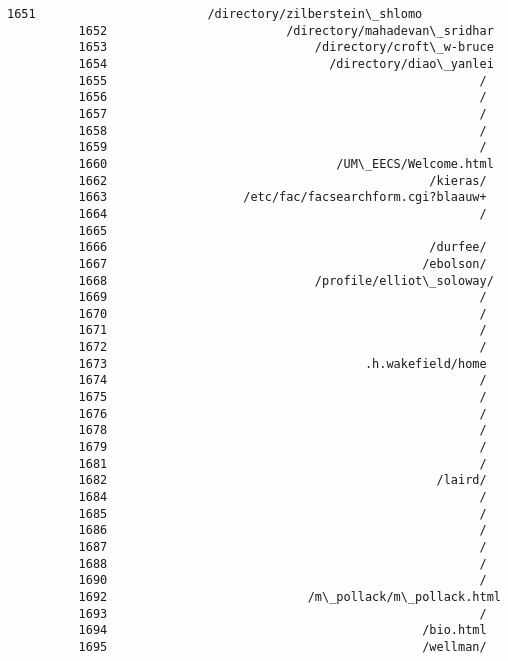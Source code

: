 \documentclass[11pt]{article}
\begin{document}
\begin{Verbatim}[commandchars=\\\{\}]
          1651                        /directory/zilberstein\_shlomo
          1652                         /directory/mahadevan\_sridhar
          1653                             /directory/croft\_w-bruce
          1654                               /directory/diao\_yanlei
          1655                                                    /
          1656                                                    /
          1657                                                    /
          1658                                                    /
          1659                                                    /
          1660                                /UM\_EECS/Welcome.html
          1662                                             /kieras/
          1663                   /etc/fac/facsearchform.cgi?blaauw+
          1664                                                    /
          1665                                                     
          1666                                             /durfee/
          1667                                            /ebolson/
          1668                             /profile/elliot\_soloway/
          1669                                                    /
          1670                                                    /
          1671                                                    /
          1672                                                    /
          1673                                    .h.wakefield/home
          1674                                                    /
          1675                                                    /
          1676                                                    /
          1678                                                    /
          1679                                                    /
          1681                                                    /
          1682                                              /laird/
          1684                                                    /
          1685                                                    /
          1686                                                    /
          1687                                                    /
          1688                                                    /
          1690                                                    /
          1692                            /m\_pollack/m\_pollack.html
          1693                                                    /
          1694                                            /bio.html
          1695                                            /wellman/

\end{Verbatim}
\end{document}
